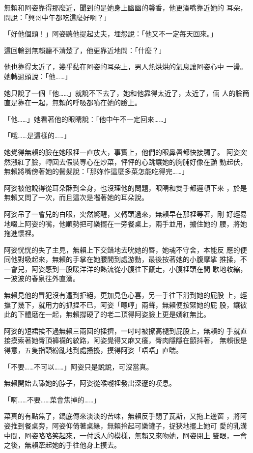 無賴和阿姿靠得那麼近，聞到的是她身上幽幽的馨香，他更湊嘴靠近她的
耳朵，問說：「興哥中午都吃這麼好啊？」

「好他個頭！」阿姿聽他提起丈夫，埋怨說：「他又不一定每天回來。」

這回輪到無賴聽不清楚了，他更靠近地問：「什麼？」

他也靠得太近了，幾乎黏在阿姿的耳朵上，男人熱烘烘的氣息讓阿姿心中
一盪。她轉過頭說：「他……」

她只說了一個「他……」就說不下去了，她和他靠得太近了，太近了，倆
人的臉簡直是靠在一起，無賴的呼吸都噴在她的臉上。

「他……」她看著他的眼睛說：「他中午不一定回來……」

「哦……是這樣的……」

她覺得無賴的臉在她眼裡一直放大，事實上，他們的眼鼻唇都快接觸了。
阿姿突然漲紅了臉，轉回去假裝專心在炒菜，怦怦的心跳讓她的胸脯好像在顫
動起伏，無賴將嘴傍著她的鬢髮說：「那妳作這麼多菜怎能吃得完……」

阿姿被他說得從耳朵酥到全身，也沒理他的問題，眼睛和雙手都遲頓下來
，於是無賴又問了一次，而且這次是囓著她的耳朵說。

阿姿吊了一會兒的白眼，突然驚醒，又轉頭過來，無賴早在那裡等著，剛
好輕易地啜上阿姿的嘴，他順勢把可樂擺在一旁餐桌上，兩手並用，擄住她的
腰，將她拖進懷裡。

阿姿恍恍的失了主見，無賴上下交錯地去吮她的唇，她魂不守舍，本能反
應的便同他對吸起來，無賴的手掌在她腰間到處游動，最後按著她的小腹摩挲
推揉，不一會兒，阿姿感到一股暖洋洋的熱流從小腹往下竄走，小腹裡頭在間
歇地收縮，一波波的春泉往外直湧。

無賴見他的冒犯沒有遭到拒絕，更加見色心喜，另一手往下滑到她的屁股
上，輕撫了幾下，就用力的抓捏不已，阿姿「嗯哼」兩聲，無賴便按緊她的屁
股，讓彼此的下體磨在一起，無賴撐硬了的老二頂得阿姿臉上更是嫣紅無比。

阿姿的短裙挨不過無賴三兩回的揉擠，一吋吋被撩高褪到屁股上，無賴的
手就直接摸索著她臀頂褲襪的紋路，阿姿覺得又麻又癢，臀肉隱隱在顫抖著，
無賴很是得意，五隻指頭紛亂地到處搔擾，摸得阿姿「唔唔」直喘。

「不要……不可以……」阿姿只是說說，可沒當真。

無賴開始去舔她的脖子，阿姿從喉嚨裡發出深邃的嘆息。

「啊……不要……菜會焦掉的……」

菜真的有點焦了，鍋底傳來淡淡的苦味，無賴反手閉了瓦斯，又拖上邊窗
，將阿姿推到餐桌旁，阿姿仰倚著桌緣，無賴拎起可樂罐子，捉狹地擺上她可
愛的乳溝中間，阿姿咯咯笑起來，一付誘人的模樣，無賴又來吻她，阿姿閉上
雙眼，一會之後，無賴牽起她的手往他身上摸去。

